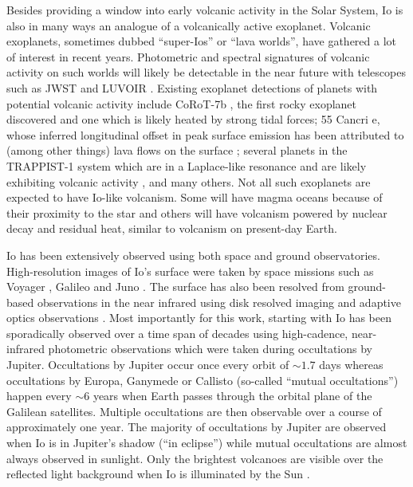 \documentclass[12pt,dvipsnames]{report}
\begin{document}
Besides providing a window into early volcanic activity in the Solar System, Io is also 
in many ways an analogue of a volcanically active exoplanet.
Volcanic exoplanets, sometimes dubbed ``super-Ios'' or ``lava worlds'', have gathered a
 lot of interest in recent years.
Photometric and spectral signatures of volcanic activity on such worlds will likely be 
detectable in the near future with telescopes such as JWST and LUVOIR 
\citep{2010AJ....140.1370K,arXiv:1804.05110,2019ApJ...885..168O,2021ChEG...81l5735C}.
Existing exoplanet detections of planets with potential volcanic activity include 
CoRoT-7b \citep{2010ApJ...709L..95B}, the first rocky exoplanet discovered and one 
which is likely heated by strong tidal forces; 55 Cancri e, whose inferred longitudinal 
offset in peak surface emission has been attributed to (among other things) lava flows 
on the surface \citep{2016MNRAS.455.2018D,2016Natur.532..207D,2017ApJ...849..152H}; 
several planets in the TRAPPIST-1 system which are in a Laplace-like resonance and 
are likely exhibiting volcanic activity \citep{2017NatAs...1..878K,2019A&A...624A...2D}, 
and many others.
Not all such exoplanets are expected to have Io-like volcanism.
Some will have magma oceans because of their proximity to the star and others will have 
volcanism powered by nuclear decay and residual heat, similar to volcanism on present-day Earth.

Io has been extensively observed using both space and ground observatories.
High-resolution images of Io's surface were taken by space missions such as Voyager 
\citep{1979Sci...204..951S}, Galileo \citep{1996Sci...274..377B} and Juno 
\citep{2020Icar..34113607M}.
The surface has also been resolved from ground-based observations in the near 
infrared using disk resolved imaging \citep{1985Sci...230...63H,1986Icar...66..403S,1990Natur.348..618S} 
and adaptive optics observations 
\citep{2000Icar..148..384M,2005Icar..176...96M,2016Icar..280..378D}.
Most importantly for this work,  starting with \citet{1990Natur.348..618S} Io 
has been sporadically observed over a time span of decades using high-cadence, near-infrared
photometric observations which were taken during occultations by Jupiter.
Occultations by Jupiter occur once every orbit of $\sim 1.7$ days whereas occultations 
by Europa, Ganymede or Callisto (so-called ``mutual occultations'') happen every 
$\sim 6$ years when Earth passes through the orbital plane of the Galilean satellites.
Multiple occultations are then observable over a course of approximately one year.
The majority of occultations by Jupiter are observed when Io is in Jupiter's shadow 
(``in eclipse'') while mutual occultations are almost always observed in sunlight.
Only the brightest volcanoes are visible over the reflected light background when Io 
is illuminated by the Sun \citep{1994JGR....9917095V,2016Icar..280..405D}.
\end{document}
